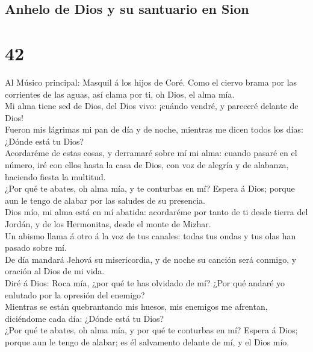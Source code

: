 \hypertarget{anhelo-de-dios-y-su-santuario-en-sion}{%
\subsection{Anhelo de Dios y su santuario en
Sion}\label{anhelo-de-dios-y-su-santuario-en-sion}}

\hypertarget{section-41}{%
\section{42}\label{section-41}}

 Al Músico principal: Masquil á los hijos de Coré. Como el
ciervo brama por las corrientes de las aguas, así clama por ti, oh Dios,
el alma mía.\\
 Mi alma tiene sed de Dios, del Dios vivo: ¡cuándo vendré,
y pareceré delante de Dios!\\
 Fueron mis lágrimas mi pan de día y de noche, mientras me
dicen todos los días: ¿Dónde está tu Dios?\\
 Acordaréme de estas cosas, y derramaré sobre mí mi alma:
cuando pasaré en el número, iré con ellos hasta la casa de Dios, con voz
de alegría y de alabanza, haciendo fiesta la multitud.\\
 ¿Por qué te abates, oh alma mía, y te conturbas en mí?
Espera á Dios; porque aun le tengo de alabar por las saludes de su
presencia.\\
 Dios mío, mi alma está en mí abatida: acordaréme por
tanto de ti desde tierra del Jordán, y de los Hermonitas, desde el monte
de Mizhar.\\
 Un abismo llama á otro á la voz de tus canales: todas tus
ondas y tus olas han pasado sobre mí.\\
 De día mandará Jehová su misericordia, y de noche su
canción será conmigo, y oración al Dios de mi vida.\\
 Diré á Dios: Roca mía, ¿por qué te has olvidado de mí?
¿Por qué andaré yo enlutado por la opresión del enemigo?\\
 Mientras se están quebrantando mis huesos, mis enemigos
me afrentan, diciéndome cada día: ¿Dónde está tu Dios?\\
 ¿Por qué te abates, oh alma mía, y por qué te conturbas
en mí? Espera á Dios; porque aun le tengo de alabar; es él salvamento
delante de mí, y el Dios mío.

